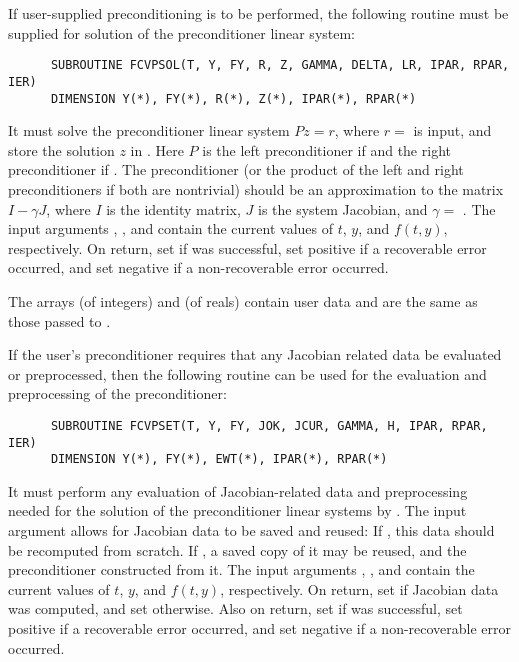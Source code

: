 \begin{Steps}
  If user-supplied preconditioning is to be performed, the following
  routine must be supplied for solution of the preconditioner linear system:
\begin{verbatim}
      SUBROUTINE FCVPSOL(T, Y, FY, R, Z, GAMMA, DELTA, LR, IPAR, RPAR, IER)
      DIMENSION Y(*), FY(*), R(*), Z(*), IPAR(*), RPAR(*)
\end{verbatim}
  It must solve the preconditioner linear system $Pz = r$, where $r =$  
  is input, and store the solution $z$ in . Here $P$ is the left 
  preconditioner if  and the right preconditioner if .  
  The preconditioner (or the product of the left and right preconditioners 
  if both are nontrivial) should be an  approximation to the matrix 
  $I - \gamma J$, where $I$ is the identity matrix, $J$ is the system Jacobian,
  and $\gamma =$ .
  The input arguments , , and  contain the current
  values of $t$, $y$, and $f(t,y)$, respectively.
  On return, set  if  was successful, set 
  positive if a recoverable error occurred, and set  negative if a 
  non-recoverable error occurred.

  The arrays  (of integers) and  (of reals) contain user data
  and are the same as those passed to .

  If the user's preconditioner requires that any Jacobian related data be evaluated
  or preprocessed, then the following routine can be used for the evaluation and 
  preprocessing of the preconditioner:
\begin{verbatim}
      SUBROUTINE FCVPSET(T, Y, FY, JOK, JCUR, GAMMA, H, IPAR, RPAR, IER)
      DIMENSION Y(*), FY(*), EWT(*), IPAR(*), RPAR(*)
\end{verbatim}
  It must perform any evaluation of Jacobian-related data and preprocessing needed
  for the solution of the preconditioner linear systems by .
  The input argument  allows for Jacobian data to be saved and reused:
  If , this data should be recomputed from scratch. If ,
  a saved copy of it may be reused, and the preconditioner constructed from it.
  The input arguments , , and  contain the current
  values of $t$, $y$, and $f(t,y)$, respectively.
  On return, set  if Jacobian data was computed, and set
   otherwise.
  Also on return, set  if  was successful, set 
  positive if a recoverable error occurred, and set  negative if a 
  non-recoverable error occurred.
  

\end{Steps}
